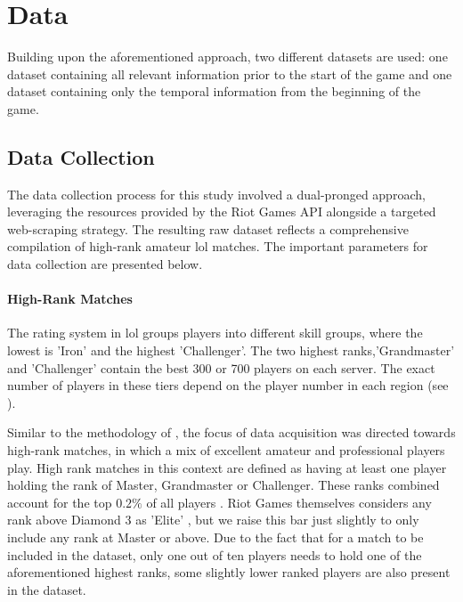\documentclass[12pt, a4paper, headinclude, twoside, plainheadsepline, open=right, numbers=noenddot, hidelinks, toc=listof, toc=bibliography]{scrreprt}
\begin{document}
\section{Data}
\label{sec:data}

Building upon the aforementioned approach, two different datasets are used: one dataset containing all relevant information prior to the start of the game and one dataset containing only the temporal information from the beginning of the game.


\subsection{Data Collection}
\label{ssec:datacoll}

The data collection process for this study involved a dual-pronged approach, leveraging the resources provided by the Riot Games API alongside a targeted web-scraping strategy.
The resulting raw dataset reflects a comprehensive compilation of high-rank amateur \acl{lol} matches.
The important parameters for data collection are presented below.

\paragraph{High-Rank Matches}
The rating system in \ac{lol} groups players into different skill groups, where the lowest is 'Iron' and the highest 'Challenger'.
The two highest ranks,'Grandmaster' and 'Challenger' contain the best 300 or 700 players on each server.
The exact number of players in these tiers depend on the player number in each region (see \cite{riotgamesMasterGrandmasterChallenger2023}).

Similar to the methodology of \citeauthor{zhangPredictionEsportsGame2021} \cite{zhangPredictionEsportsGame2021}, the focus of data acquisition was directed towards high-rank matches, in which a mix of excellent amateur and professional players play.
High rank matches in this context are defined as having at least one player holding the rank of Master, Grandmaster or Challenger.
These ranks combined account for the top $0.2\%$ of all players \cite{riotgamesRankedTiersDivisions2023}.
Riot Games themselves considers any rank above Diamond 3 as 'Elite' \cite{riotgamesDevBalanceFramework2020}, but we raise this bar just slightly to only include any rank at Master or above.
Due to the fact that for a match to be included in the dataset, only one out of ten players needs to hold one of the aforementioned highest ranks, some slightly lower ranked players are also present in the dataset.
\end{document}
